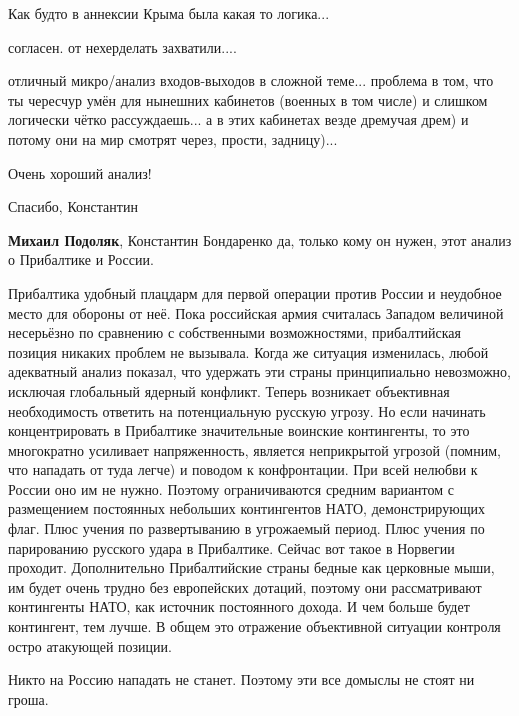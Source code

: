 \begin{itemize}
Как будто в аннексии Крыма была какая то логика...

согласен. от нехерделать захватили....


отличный микро/анализ входов-выходов в сложной теме... проблема в том, что ты чересчур умён для нынешних кабинетов (военных в том числе) и слишком логически чётко рассуждаешь... а в этих кабинетах везде дремучая дрем) и потому они на мир смотрят через, прости, задницу)...


Очень хороший анализ!

Спасибо, Константин

\textbf{Михаил Подоляк}, Константин Бондаренко да, только кому он нужен, этот анализ о Прибалтике и России.


Прибалтика удобный плацдарм для первой операции против России и неудобное место
для обороны от неё. Пока российская армия считалась Западом величиной
несерьёзно по сравнению с собственными возможностями, прибалтийская позиция
никаких проблем не вызывала. Когда же ситуация изменилась, любой адекватный
анализ показал, что удержать эти страны принципиально невозможно, исключая
глобальный ядерный конфликт. Теперь возникает объективная необходимость
ответить на потенциальную русскую угрозу. Но если начинать концентрировать в
Прибалтике значительные воинские контингенты, то это многократно усиливает
напряженность, является неприкрытой угрозой (помним, что нападать от туда
легче) и поводом к конфронтации. При всей нелюбви к России оно им не нужно.
Поэтому ограничиваются средним вариантом с размещением постоянных небольших
контингентов НАТО, демонстрирующих флаг. Плюс учения по развертыванию в
угрожаемый период. Плюс учения по парированию русского удара в Прибалтике.
Сейчас вот такое в Норвегии проходит. Дополнительно Прибалтийские страны бедные
как церковные мыши, им будет очень трудно без европейских дотаций, поэтому они
рассматривают контингенты НАТО, как источник постоянного дохода. И чем больше
будет контингент, тем лучше. В общем это отражение объективной ситуации
контроля остро атакующей позиции.

\begin{itemize} %
Никто на Россию нападать не станет. Поэтому эти все домыслы не стоят ни гроша.


\end{itemize}
\end{itemize}
